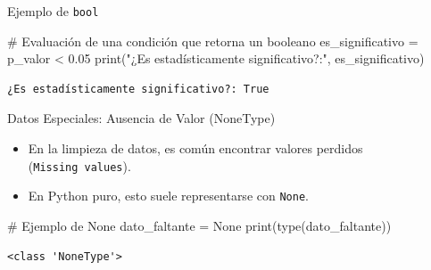 \documentclass[
  ignorenonframetext,
  aspectratio=169,
  spanish,
]{beamer}
\newenvironment{Shaded}{\begin{snugshade}}{\end{snugshade}}
\newcommand{\BuiltInTok}[1]{\textcolor[rgb]{0.00,0.23,0.31}{#1}}
\newcommand{\CommentTok}[1]{\textcolor[rgb]{0.37,0.37,0.37}{#1}}
\newcommand{\FloatTok}[1]{\textcolor[rgb]{0.68,0.00,0.00}{#1}}
\newcommand{\NormalTok}[1]{\textcolor[rgb]{0.00,0.23,0.31}{#1}}
\newcommand{\OperatorTok}[1]{\textcolor[rgb]{0.37,0.37,0.37}{#1}}
\newcommand{\StringTok}[1]{\textcolor[rgb]{0.13,0.47,0.30}{#1}}
\newcommand{\VariableTok}[1]{\textcolor[rgb]{0.07,0.07,0.07}{#1}}
\begin{document}
\begin{frame}[fragile]{Ejemplo de \texttt{bool}}
\label{ejemplo-de-bool}
\begin{Shaded}
\begin{Highlighting}[]
\CommentTok{\# Evaluación de una condición que retorna un booleano}
\NormalTok{es\_significativo }\OperatorTok{=}\NormalTok{ p\_valor }\OperatorTok{\textless{}} \FloatTok{0.05}
\BuiltInTok{print}\NormalTok{(}\StringTok{"¿Es estadísticamente significativo?:"}\NormalTok{, es\_significativo)}
\end{Highlighting}
\end{Shaded}

\begin{verbatim}
¿Es estadísticamente significativo?: True
\end{verbatim}
\end{frame}

\begin{frame}[fragile]{Datos Especiales: Ausencia de Valor (NoneType)}
\label{datos-especiales-ausencia-de-valor-nonetype}
\begin{itemize}
\item
  En la limpieza de datos, es común encontrar valores perdidos
  (\texttt{Missing\ values}).
\item
  En Python puro, esto suele representarse con \texttt{None}.
\end{itemize}

\begin{Shaded}
\begin{Highlighting}[]
\CommentTok{\# Ejemplo de None}
\NormalTok{dato\_faltante }\OperatorTok{=} \VariableTok{None}
\BuiltInTok{print}\NormalTok{(}\BuiltInTok{type}\NormalTok{(dato\_faltante))}
\end{Highlighting}
\end{Shaded}

\begin{verbatim}
<class 'NoneType'>
\end{verbatim}
\end{frame}
\end{document}
